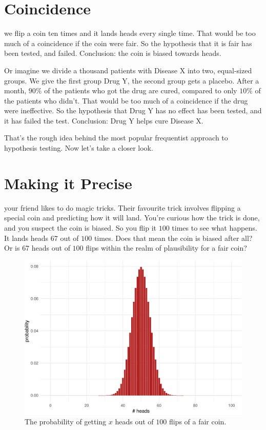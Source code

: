 \documentclass[justified]{tufte-book}
\theoremstyle{definition}
\theoremstyle{definition}
\theoremstyle{definition}
\theoremstyle{remark}
\begin{document}
\hypertarget{coincidence}{%
\section{Coincidence}\label{coincidence}}

 we flip a coin ten times and it lands heads every
single time. That would be too much of a coincidence if the coin were
fair. So the hypothesis that it is fair has been tested, and failed.
Conclusion: the coin is biased towards heads.

Or imagine we divide a thousand patients with Disease X into two,
equal-sized groups. We give the first group Drug Y, the second group
gets a placebo. After a month, \(90\%\) of the patients who got the drug
are cured, compared to only \(10\%\) of the patients who didn't. That
would be too much of a coincidence if the drug were ineffective. So the
hypothesis that Drug Y has no effect has been tested, and it has failed
the test. Conclusion: Drug Y helps cure Disease X.

That's the rough idea behind the most popular frequentist approach to
hypothesis testing. Now let's take a closer look.

\hypertarget{making-it-precise}{%
\section{Making it Precise}\label{making-it-precise}}

 your friend likes to do magic tricks. Their
favourite trick involves flipping a special coin and predicting how it
will land. You're curious how the trick is done, and you suspect the
coin is biased. So you flip it \(100\) times to see what happens. It
lands heads \(67\) out of \(100\) times. Does that mean the coin is
biased after all? Or is \(67\) heads out of \(100\) flips within the
realm of plausibility for a fair coin?

\begin{figure}
\includegraphics{_main_files/figure-latex/binom100-1} \caption[The probability of getting $x$ heads out of $100$ flips of a fair coin]{The probability of getting $x$ heads out of $100$ flips of a fair coin.}\label{fig:binom100}
\end{figure}
\end{document}
